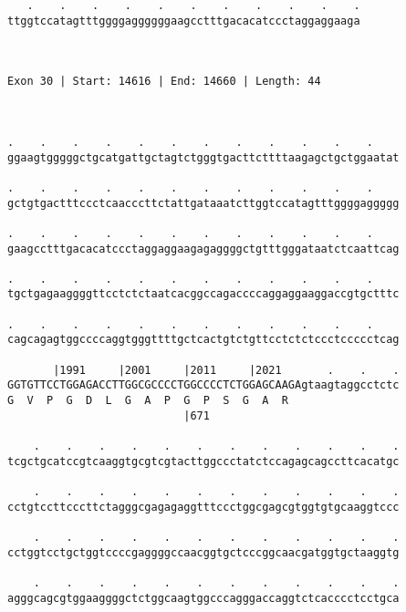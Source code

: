 \documentclass{article}
\begin{document}
\begin{Verbatim}
   .    .    .    .    .    .    .    .    .    .    .
ttggtccatagtttggggaggggggaagcctttgacacatccctaggaggaaga
                                                      
                                                      
 
Exon 30 | Start: 14616 | End: 14660 | Length: 44



.    .    .    .    .    .    .    .    .    .    .    .    
ggaagtgggggctgcatgattgctagtctgggtgacttcttttaagagctgctggaatat
                                                            
.    .    .    .    .    .    .    .    .    .    .    .    
gctgtgactttccctcaacccttctattgataaatcttggtccatagtttggggaggggg
                                                            
.    .    .    .    .    .    .    .    .    .    .    .    
gaagcctttgacacatccctaggaggaagagaggggctgtttgggataatctcaattcag
                                                            
.    .    .    .    .    .    .    .    .    .    .    .    
tgctgagaaggggttcctctctaatcacggccagaccccaggaggaaggaccgtgctttc
                                                            
.    .    .    .    .    .    .    .    .    .    .    .    
cagcagagtggccccaggtgggttttgctcactgtctgttcctctctccctccccctcag
                                                            
       |1991     |2001     |2011     |2021       .    .    .
GGTGTTCCTGGAGACCTTGGCGCCCCTGGCCCCTCTGGAGCAAGAgtaagtaggcctctc
G  V  P  G  D  L  G  A  P  G  P  S  G  A  R                 
                           |671                             
  
    .    .    .    .    .    .    .    .    .    .    .    .
tcgctgcatccgtcaaggtgcgtcgtacttggccctatctccagagcagccttcacatgc
                                                            
    .    .    .    .    .    .    .    .    .    .    .    .
cctgtccttcccttctagggcgagagaggtttccctggcgagcgtggtgtgcaaggtccc
                                                            
    .    .    .    .    .    .    .    .    .    .    .    .
cctggtcctgctggtccccgaggggccaacggtgctcccggcaacgatggtgctaaggtg
                                                            
    .    .    .    .    .    .    .    .    .    .    .    .
agggcagcgtggaaggggctctggcaagtggcccagggaccaggtctcacccctcctgca
                                                            

\end{Verbatim}
\end{document}
